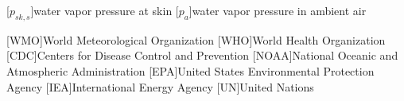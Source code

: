 \begin{acronym}[longest]
    [$p_{sk,s}$]{water vapor pressure at skin}
    [$p_{a}$]{water vapor pressure in ambient air}

    [WMO]{World Meteorological Organization}
    [WHO]{World Health Organization}
    [CDC]{Centers for Disease Control and Prevention}
    [NOAA]{National Oceanic and Atmospheric Administration}
    [EPA]{United States Environmental Protection Agency}
    [IEA]{International Energy Agency}
    [UN]{United Nations}

\end{acronym}
\renewcommand{\baselinestretch}{1}\normalsize
